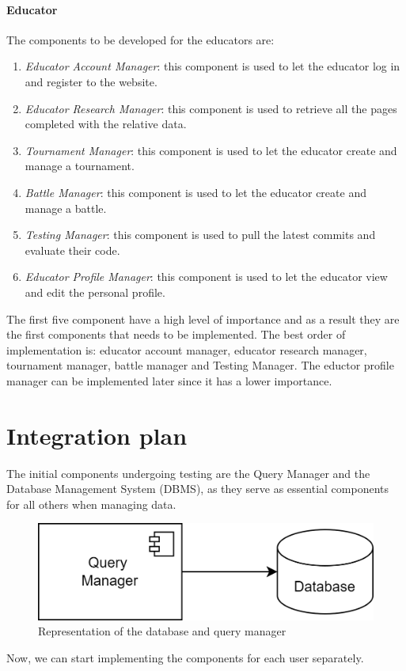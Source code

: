 \documentclass[12pt, a4paper]{report}
\begin{document}
    \paragraph*{Educator}
    The components to be developed for the educators are: 
    \begin{enumerate}
        \item \textit{Educator Account Manager}: this component is used to let the educator log in and register to the website. 
        \item \textit{Educator Research Manager}: this component is used to retrieve all the pages completed with the relative data. 
        \item \textit{Tournament Manager}: this component is used to let the educator create and manage a tournament.  
        \item \textit{Battle Manager}: this component is used to let the educator create and manage a battle.
        \item \textit{Testing Manager}: this component is used to pull the latest commits and evaluate their code.  
        \item \textit{Educator Profile Manager}: this component is used to let the educator view and edit the personal profile.
    \end{enumerate}
    The first five component have a high level of importance and as a result they are the first components that needs to be implemented. 
    The best order of implementation is: educator account manager, educator research manager, tournament manager, battle manager and Testing Manager. 
    The eductor profile manager can be implemented later since it has a lower importance. 

    \section{Integration plan}
    The initial components undergoing testing are the Query Manager and the Database Management System (DBMS), as they serve as essential components for all others when managing data.
    \begin{figure}[H]
        \centering
        \includegraphics[width=0.5\linewidth]{images/data.png}
        \caption{Representation of the database and query manager}
    \end{figure}
    Now, we can start implementing the components for each user separately. 
\end{document}
